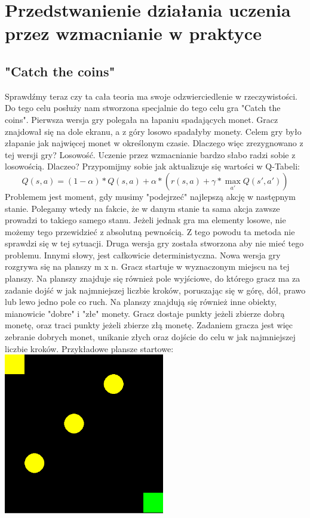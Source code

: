\documentclass[a4paper,12pt]{article}
\begin{document}
\section{Przedstwanienie działania uczenia przez wzmacnianie w praktyce}

\subsection{"Catch the coins"}

Sprawdźmy teraz czy ta cała teoria ma swoje odzwierciedlenie w rzeczywistości. Do tego celu posłuży nam stworzona specjalnie do tego celu gra "Catch the coins".
Pierwsza wersja gry polegała na łapaniu spadających monet. Gracz znajdował się na dole ekranu, a z góry losowo spadałyby monety. Celem gry było złapanie jak najwięcej monet w określonym czasie. Dlaczego więc zrezygnowano z tej wersji gry? Losowość.
Uczenie przez wzmacnianie bardzo słabo radzi sobie z losowością. Dlaczeo? Przypomijmy sobie jak aktualizuje się wartości w Q-Tabeli:
\[ Q(s, a) =  (1 - \alpha )*Q(s, a) + \alpha * ( r(s, a) + \gamma * \max_{a'}Q(s', a') )\]
\newline Problemem jest moment, gdy musimy "podejrzeć" najlepszą akcję w następnym stanie. Polegamy wtedy na fakcie, że w danym stanie ta sama akcja zawsze prowadzi to takiego samego stanu. Jeżeli jednak gra ma elementy losowe, nie możemy tego przewidzieć z absolutną pewnością. Z tego powodu ta metoda nie sprawdzi się w tej sytuacji. Druga wersja gry została stworzona aby nie mieć tego problemu. Innymi słowy, jest całkowicie deterministyczna.
\newline \newline
Nowa wersja gry rozgrywa się na planszy m x n. Gracz startuje w wyznaczonym miejscu na tej planszy. Na planszy znajduje się również pole wyjściowe, do którego gracz ma za zadanie dojść w jak najmniejszej liczbie kroków, poruszając się w górę, dół, prawo lub lewo jedno pole co ruch. Na planszy znajdują się również inne obiekty, mianowicie "dobre" i "złe" monety. Gracz dostaje punkty jeżeli zbierze dobrą monetę, oraz traci punkty jeżeli zbierze złą monetę. Zadaniem gracza jest więc zebranie dobrych monet, unikanie złych oraz dojście do celu w jak najmniejszej liczbie kroków.
\newline Przykładowe plansze startowe: \newline
\includegraphics[width=70mm]{przyklad1.png}
\end{document}
